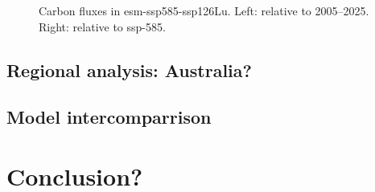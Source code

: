 \documentclass[]{article}
\begin{document}
\begin{figure}[!h]
    \centering
    \begin{subfigure}[b]{0.4\linewidth}
        
    \end{subfigure}
    \begin{subfigure}[b]{0.4\linewidth}
        
    \end{subfigure}
    \begin{subfigure}[b]{0.4\linewidth}
        
    \end{subfigure}
    \begin{subfigure}[b]{0.4\linewidth}
        
    \end{subfigure}
    \begin{subfigure}[b]{0.4\linewidth}
        
    \end{subfigure}
    \begin{subfigure}[b]{0.4\linewidth}
        
    \end{subfigure}
    \begin{subfigure}[b]{0.4\linewidth}
        
    \end{subfigure}
    \begin{subfigure}[b]{0.4\linewidth}
        
    \end{subfigure}
    \begin{subfigure}[b]{0.4\linewidth}
        
    \end{subfigure}
    \begin{subfigure}[b]{0.4\linewidth}
        
    \end{subfigure}
    \caption{Carbon fluxes in esm-ssp585-ssp126Lu.  Left: relative to 2005–2025. Right: relative to ssp-585.}
    \label{fig:cflux}
\end{figure}

\pagebreak

\subsection{Regional analysis: Australia?}


\subsection{Model intercomparrison}


\section{Conclusion?}

\printbibliography
\end{document}

